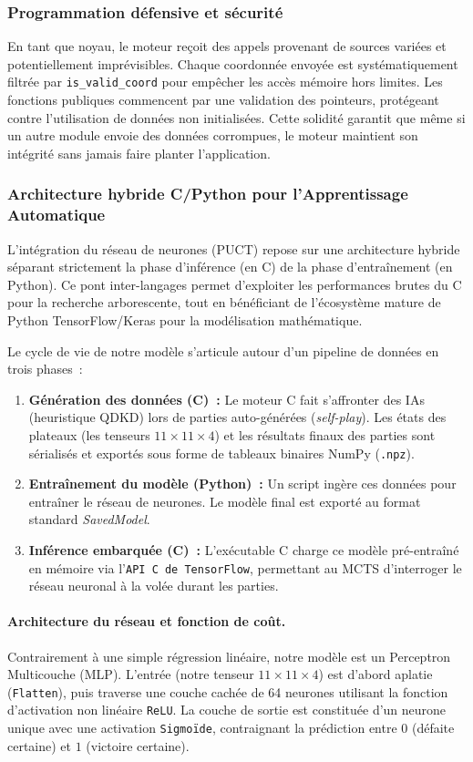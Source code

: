 \documentclass[a4paper]{article}
\begin{document}
\subsubsection{Programmation défensive et sécurité}
En tant que noyau, le moteur reçoit des appels provenant de sources variées et potentiellement imprévisibles. Chaque coordonnée envoyée est systématiquement filtrée par \texttt{is\_valid\_coord} pour empêcher les accès mémoire hors limites. Les fonctions publiques commencent par une validation des pointeurs, protégeant contre l'utilisation de données non initialisées. Cette solidité garantit que même si un autre module envoie des données corrompues, le moteur maintient son intégrité sans jamais faire planter l'application.

\subsubsection{Architecture hybride C/Python pour l'Apprentissage Automatique}

L'intégration du réseau de neurones (PUCT) repose sur une architecture hybride séparant strictement la phase d'inférence (en C) de la phase d'entraînement (en Python). Ce pont inter-langages permet d'exploiter les performances brutes du C pour la recherche arborescente, tout en bénéficiant de l'écosystème mature de Python TensorFlow/Keras pour la modélisation mathématique.

Le cycle de vie de notre modèle s'articule autour d'un pipeline de données en trois phases~:
\begin{enumerate}
    \item \textbf{Génération des données (C)~:} Le moteur C fait s'affronter des IAs (heuristique QDKD) lors de parties auto-générées (\textit{self-play}). Les états des plateaux (les tenseurs $11 \times 11 \times 4$) et les résultats finaux des parties sont sérialisés et exportés sous forme de tableaux binaires NumPy (\texttt{.npz}).
    \item \textbf{Entraînement du modèle (Python)~:} Un script ingère ces données pour entraîner le réseau de neurones. Le modèle final est exporté au format standard \textit{SavedModel}.
    \item \textbf{Inférence embarquée (C)~:} L'exécutable C charge ce modèle pré-entraîné en mémoire via l'\texttt{API C de TensorFlow}, permettant au MCTS d'interroger le réseau neuronal à la volée durant les parties.
\end{enumerate}

\paragraph{Architecture du réseau et fonction de coût.}
Contrairement à une simple régression linéaire, notre modèle est un Perceptron Multicouche (MLP). L'entrée (notre tenseur $11 \times 11 \times 4$) est d'abord aplatie (\texttt{Flatten}), puis traverse une couche cachée de 64 neurones utilisant la fonction d'activation non linéaire \texttt{ReLU}. La couche de sortie est constituée d'un neurone unique avec une activation \texttt{Sigmoïde}, contraignant la prédiction entre $0$ (défaite certaine) et $1$ (victoire certaine). 
\end{document}
